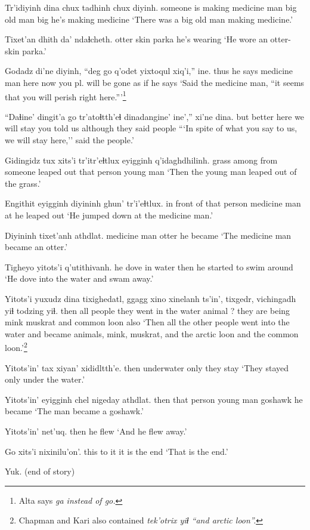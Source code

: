 \documentclass[12pt]{article}
\begin{document}
\gll Tr'idiyinh   dina chux tadhinh chux diyinh.
{someone is making medicine} man big {old man} big {he's making medicine}
\glt `There was a big old man making medicine.'
\glend

\gll Tixet'an dhith da' ndaɬcheth.
otter  skin parka {he's wearing}
\glt `He wore an otter-skin parka.'
\glend

\gll Godadz di'ne diyinh, {``deg go} q'odet yixtoqul  xiq'i,'' ine.
thus  {he says} {medicine man} here now {you pl. will be gone} {as if} {he says}
\glt `Said the medicine man, ``it seems that you will perish right here.'''\footnote{Alta says \em ga \em instead of \em go.}
\glend

\gll ``Daɬine' dingit'a go tr'atoɬtth'eɬ  dinadangine' ine','' xi'ne dina.
but better  here {we will stay} {you told us} although {they said} people
\glt ```In spite of what you say to us, we will stay here,'' said the people.'
\glend

\gll Gidingidz tux  xits'i tr'itr'eɬtlux  eyigginh q'idaghdhilinh.
grass  among  from {someone leaped out} {that person} {young man}
\glt `Then the young man leaped out of the grass.'
\glend

\gll Engithit eyigginh diyininh ghun' tr'i'eɬtlux.
{in front of} {that person} {medicine man} at {he leaped out}
\glt `He jumped down at the medicine man.'
\glend

\gll Diyininh  tixet'anh athdlat.
{medicine man} otter  {he became}
\glt `The medicine man became an otter.'
\glend

\gll Tigheyo yitots'i q'utithivanh.
{he dove in water} then {he started to swim around}
\glt `He dove into the water and swam away.'
\glend

\gll Yitots'i yuxudz dina tixighedatl,  ggagg xino xinelanh ts'in', tixgedr, vichingadh yiɬ todzing yiɬ.
then  all  people {they went in the water} animal ? {they are} being mink  muskrat and {common loon} also
\glt `Then all the other people went into the water and became animals, mink, muskrat, and the arctic loon and the common loon.'\footnote{Chapman and Kari also contained \em tek'otrix yiɬ \em ``and arctic loon''.}
\glend

\gll Yitots'in' tax  xiyan' xididltth'e.
then  underwater only  {they stay}
\glt `They stayed only under the water.'
\glend

\gll Yitots'in' eyigginh chel nigeday athdlat.
then  {that person} {young man} goshawk {he became}
\glt `The man became a goshawk.'
\glend

\gll Yitots'in' net'uq.
then  {he flew}
\glt `And he flew away.'
\glend

\gll Go xits'i nixinilu'on'.
this  {to it} {it is the end}
\glt `That is the end.'
\glend

\gll Yuk.
{{(end of story)}}
\glt 
\glend 
\end{document}
